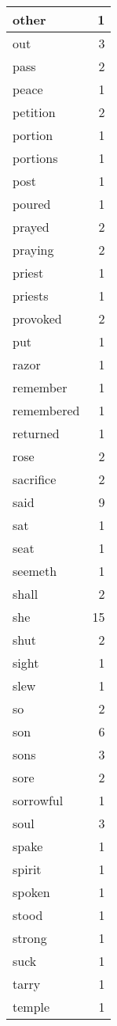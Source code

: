\begin{center}
\begin{longtable}{l|r}
other & 1 \\ \hline
out & 3 \\ \hline
pass & 2 \\ \hline
peace & 1 \\ \hline
petition & 2 \\ \hline
portion & 1 \\ \hline
portions & 1 \\ \hline
post & 1 \\ \hline
poured & 1 \\ \hline
prayed & 2 \\ \hline
praying & 2 \\ \hline
priest & 1 \\ \hline
priests & 1 \\ \hline
provoked & 2 \\ \hline
put & 1 \\ \hline
razor & 1 \\ \hline
remember & 1 \\ \hline
remembered & 1 \\ \hline
returned & 1 \\ \hline
rose & 2 \\ \hline
sacrifice & 2 \\ \hline
said & 9 \\ \hline
sat & 1 \\ \hline
seat & 1 \\ \hline
seemeth & 1 \\ \hline
shall & 2 \\ \hline
she & 15 \\ \hline
shut & 2 \\ \hline
sight & 1 \\ \hline
slew & 1 \\ \hline
so & 2 \\ \hline
son & 6 \\ \hline
sons & 3 \\ \hline
sore & 2 \\ \hline
sorrowful & 1 \\ \hline
soul & 3 \\ \hline
spake & 1 \\ \hline
spirit & 1 \\ \hline
spoken & 1 \\ \hline
stood & 1 \\ \hline
strong & 1 \\ \hline
suck & 1 \\ \hline
tarry & 1 \\ \hline
temple & 1 \\ \hline

\end{longtable}
\end{center}
